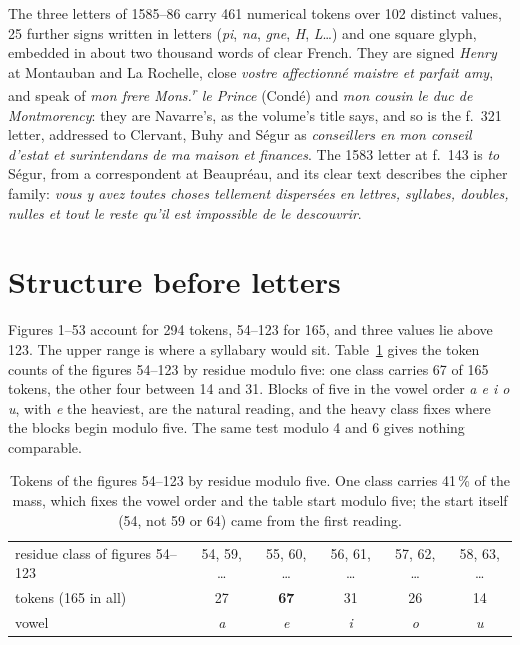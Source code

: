 \documentclass[11pt]{article}
\begin{document}
The three letters of 1585--86 carry 461 numerical tokens over 102 distinct values, 25 further signs written in letters (\emph{pi}, \emph{na}, \emph{gne}, \emph{H}, \emph{L}\ldots) and one square glyph, embedded in about two thousand words of clear French. They are signed \emph{Henry} at Montauban and La Rochelle, close \emph{vostre affectionn\'e maistre et parfait amy}, and speak of \emph{mon frere Mons.\textsuperscript{r} le Prince} (Cond\'e) and \emph{mon cousin le duc de Montmorency}: they are Navarre's, as the volume's title says, and so is the f.~321 letter, addressed to Clervant, Buhy and S\'egur as \emph{conseillers en mon conseil d'estat et surintendans de ma maison et finances}. The 1583 letter at f.~143 is \emph{to} S\'egur, from a correspondent at Beaupr\'eau, and its clear text describes the cipher family: \emph{vous y avez toutes choses tellement dispers\'ees en lettres, syllabes, doubles, nulles et tout le reste qu'il est impossible de le descouvrir}.

\section{Structure before letters}

Figures 1--53 account for 294 tokens, 54--123 for 165, and three values lie above 123. The upper range is where a syllabary would sit. Table~\ref{tab:mod5} gives the token counts of the figures 54--123 by residue modulo five: one class carries 67 of 165 tokens, the other four between 14 and 31. Blocks of five in the vowel order \emph{a e i o u}, with \emph{e} the heaviest, are the natural reading, and the heavy class fixes where the blocks begin modulo five. The same test modulo 4 and 6 gives nothing comparable.

\begin{table}[t]
\centering\small
\begin{tabular}{@{}lccccc@{}}
\toprule
residue class of figures 54--123 & 54, 59, \ldots & 55, 60, \ldots & 56, 61, \ldots & 57, 62, \ldots & 58, 63, \ldots \\
tokens (165 in all) & 27 & \textbf{67} & 31 & 26 & 14 \\
vowel & \emph{a} & \emph{e} & \emph{i} & \emph{o} & \emph{u} \\
\bottomrule
\end{tabular}
\caption{\label{tab:mod5} Tokens of the figures 54--123 by residue modulo five. One class carries 41\,\% of the mass, which fixes the vowel order and the table start modulo five; the start itself (54, not 59 or 64) came from the first reading.}
\end{table}
\end{document}
